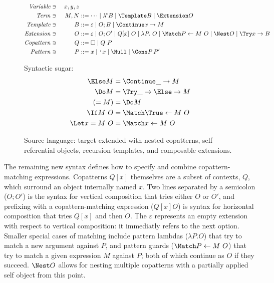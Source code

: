 \begin{figure}[t]
\centering

\begin{alignat*}{2}
  \mathit{Variable} &\ni{}& x, y, z
  \\
  \mathit{Term} &\ni{}& M, N
  &::= \dots
  \mid \lamstar B
  \mid \Template B
  \mid \Extension O
  \\
  \mathit{Template} &\ni{}& B
  &::= \varepsilon
  \mid O; B
  \mid \Continue x \to M
  \\
  \mathit{Extension} &\ni{}& O
  &::= \varepsilon
  \mid O; O'
  \mid Q[x] ~ O
  \mid \lambda P.~ O
  \mid \Match P \gets M ~ O
  \mid \Nest O
  \mid \Try x \to B
  \\
  \mathit{Copattern} &\ni{}& Q
  &::= \hole
  \mid Q ~ P
  \\
  \mathit{Pattern} &\ni{}& P
  &::= x
  \mid \q{x}
  \mid \Null
  \mid \Cons P \, P'
\end{alignat*}

Syntactic sugar:
\begin{align*}
  \Else M
  &=
  \Continue \_ \to M
  \\
  \Do M
  &=
  \Try \_ \to \Else \to M
  \\
  (= M)
  &=
  \Do M
  \\
  \If M ~ O
  &=
  \Match \True \gets M ~ O
  \\
  \Let x = M ~ O
  &=
  \Match x \gets M ~ O
\end{align*}
\caption{Source language: target extended with nested copatterns,
  self-referential objects, recursion templates, and composable extensions.}
\label{fig:source-syntax}
\end{figure}

The remaining new syntax defines how to specify and combine copattern-matching expressions.
Copatterns $Q[x]$ themselves are a subset of contexts, $Q$, which surround an object internally named $x$.
Two lines separated by a semicolon ($O; O'$) is the syntax for vertical composition that tries either $O$ or $O'$, and prefixing with a copattern-matching expression ($Q[x] O$) is syntax for horizontal composition that tries $Q[x]$ and then $O$.
The $\varepsilon$ represents an empty extension with respect to vertical composition: it immediatly refers to the next option.
Smaller special cases of matching include pattern lambdas ($\lambda P. O$) that try to match a new argument against $P$, and pattern guards ($\Match P \gets M ~ O$) that try to match a given expression $M$ against $P$; both of which continue as $O$ if they succeed.
$\Nest O$ allows for nesting multiple copatterns with a partially applied self object from this point.

